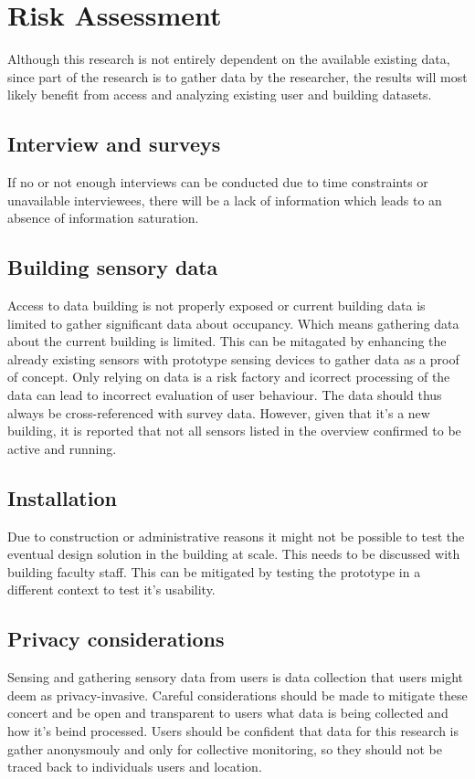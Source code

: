 \section{Risk Assessment}

Although this research is not entirely dependent on the available existing data, since part of the research is to gather data by the researcher, the results will most likely benefit from access and analyzing existing user and building datasets.

\subsection{Interview and surveys}

If no or not enough interviews can be conducted due to time constraints or unavailable interviewees, there will be a lack of information which leads to an absence of information saturation. 

\subsection{Building sensory data}

Access to data building is not properly exposed or current building data is limited to gather significant data about occupancy. Which means gathering data about the current building is limited. This can be mitagated by enhancing the already existing sensors with prototype sensing devices to gather data as a proof of concept. Only relying on data is a risk factory and icorrect processing of the data can lead to incorrect evaluation of user behaviour. The data should thus always be cross-referenced with survey data. However, given that it’s a new building, it is reported that not all sensors listed in the overview confirmed to be active and running.

\subsection{Installation}

Due to construction or administrative reasons it might not be possible to test the eventual design solution in the building at scale. This needs to be discussed with building faculty staff. This can be mitigated by testing the prototype in a different context to test it's usability.

\subsection{Privacy considerations}
Sensing and gathering sensory data from users is data collection that users might deem as privacy-invasive. Careful considerations should be made to mitigate these concert and be open and transparent to users what data is being collected and how it's beind processed. Users should be confident that data for this research is gather anonysmouly and only for collective monitoring, so they should not be traced back to individuals users and location.

